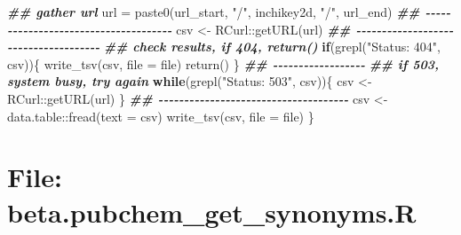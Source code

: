 \documentclass[
]{article}
\newenvironment{Shaded}{\begin{snugshade}}{\end{snugshade}}
\newcommand{\AttributeTok}[1]{\textcolor[rgb]{0.77,0.63,0.00}{#1}}
\newcommand{\ControlFlowTok}[1]{\textcolor[rgb]{0.13,0.29,0.53}{\textbf{#1}}}
\newcommand{\DocumentationTok}[1]{\textcolor[rgb]{0.56,0.35,0.01}{\textbf{\textit{#1}}}}
\newcommand{\FunctionTok}[1]{\textcolor[rgb]{0.00,0.00,0.00}{#1}}
\newcommand{\NormalTok}[1]{#1}
\newcommand{\OtherTok}[1]{\textcolor[rgb]{0.56,0.35,0.01}{#1}}
\newcommand{\SpecialCharTok}[1]{\textcolor[rgb]{0.00,0.00,0.00}{#1}}
\newcommand{\StringTok}[1]{\textcolor[rgb]{0.31,0.60,0.02}{#1}}
\begin{document}
\begin{Shaded}
\begin{Highlighting}[]
    \DocumentationTok{\#\# gather url}
\NormalTok{    url }\OtherTok{=} \FunctionTok{paste0}\NormalTok{(url\_start, }\StringTok{"/"}\NormalTok{, inchikey2d, }\StringTok{"/"}\NormalTok{, url\_end)}
    \DocumentationTok{\#\# {-}{-}{-}{-}{-}{-}{-}{-}{-}{-}{-}{-}{-}{-}{-}{-}{-}{-}{-}{-}{-}{-}{-}{-}{-}{-}{-}{-}{-}{-}{-}{-}{-}{-}{-}{-}{-} }
\NormalTok{    csv }\OtherTok{\textless{}{-}}\NormalTok{ RCurl}\SpecialCharTok{::}\FunctionTok{getURL}\NormalTok{(url)}
    \DocumentationTok{\#\# {-}{-}{-}{-}{-}{-}{-}{-}{-}{-}{-}{-}{-}{-}{-}{-}{-}{-}{-}{-}{-}{-}{-}{-}{-}{-}{-}{-}{-}{-}{-}{-}{-}{-}{-}{-}{-} }
    \DocumentationTok{\#\# check results, if 404, return()}
    \ControlFlowTok{if}\NormalTok{(}\FunctionTok{grepl}\NormalTok{(}\StringTok{"Status: 404"}\NormalTok{, csv))\{}
      \FunctionTok{write\_tsv}\NormalTok{(csv, }\AttributeTok{file =}\NormalTok{ file)}
      \FunctionTok{return}\NormalTok{()}
\NormalTok{    \}}
    \DocumentationTok{\#\# {-}{-}{-}{-}{-}{-}{-}{-}{-}{-}{-}{-}{-}{-}{-}{-}{-}{-}}
    \DocumentationTok{\#\# if 503, system busy, try again}
    \ControlFlowTok{while}\NormalTok{(}\FunctionTok{grepl}\NormalTok{(}\StringTok{"Status:    503"}\NormalTok{, csv))\{}
\NormalTok{      csv }\OtherTok{\textless{}{-}}\NormalTok{ RCurl}\SpecialCharTok{::}\FunctionTok{getURL}\NormalTok{(url)}
\NormalTok{    \}}
    \DocumentationTok{\#\# {-}{-}{-}{-}{-}{-}{-}{-}{-}{-}{-}{-}{-}{-}{-}{-}{-}{-}{-}{-}{-}{-}{-}{-}{-}{-}{-}{-}{-}{-}{-}{-}{-}{-}{-}{-}{-} }
\NormalTok{    csv }\OtherTok{\textless{}{-}}\NormalTok{ data.table}\SpecialCharTok{::}\FunctionTok{fread}\NormalTok{(}\AttributeTok{text =}\NormalTok{ csv)}
    \FunctionTok{write\_tsv}\NormalTok{(csv, }\AttributeTok{file =}\NormalTok{ file)}
\NormalTok{  \}}
\end{Highlighting}
\end{Shaded}

\hypertarget{file-beta.pubchem_get_synonyms.r}{%
\section{File: beta.pubchem\_get\_synonyms.R}\label{file-beta.pubchem_get_synonyms.r}}
\end{document}
